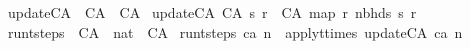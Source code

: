 \begin{isabellebody}
\isanewline
{}\isamarkupfalse%
\ update{\isacharunderscore}CA\ {\isacharcolon}{\isacharcolon}\ {\isachardoublequoteopen}CA\ {\isasymRightarrow}\ CA{\isachardoublequoteclose}\ \isanewline
{\isachardoublequoteopen}update{\isacharunderscore}CA\ {\isacharparenleft}CA\ s\ r{\isacharparenright}\ {\isacharequal}\ CA\ {\isacharparenleft}map\ r\ {\isacharparenleft}nbhds\ s{\isacharparenright}{\isacharparenright}\ r{\isachardoublequoteclose}\isanewline
\isanewline
{}\isamarkupfalse%
\ run{\isacharunderscore}t{\isacharunderscore}steps\ {\isacharcolon}{\isacharcolon}\ {\isachardoublequoteopen}CA\ {\isasymRightarrow}\ nat\ {\isasymRightarrow}\ CA{\isachardoublequoteclose}\ \isanewline
{\isachardoublequoteopen}run{\isacharunderscore}t{\isacharunderscore}steps\ ca\ n\ {\isacharequal}\ apply{\isacharunderscore}t{\isacharunderscore}times\ update{\isacharunderscore}CA\ ca\ n{\isachardoublequoteclose}\isanewline
%
\isadelimtheory
%
\endisadelimtheory
%
\isatagtheory
{}\isamarkupfalse%
%
\endisatagtheory
{\isafoldtheory}%
%
\isadelimtheory
%
\endisadelimtheory
%
\end{isabellebody}%
\endinput
